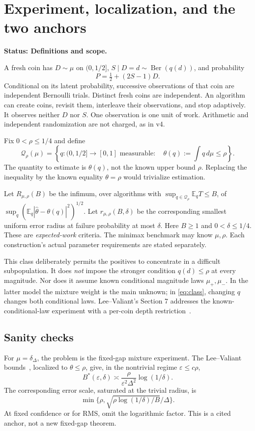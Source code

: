 \documentclass[11pt]{article}
\theoremstyle{definition}\newtheorem{conjecture}[theorem]{Conjecture}
\theoremstyle{remark}\newtheorem{remark}[theorem]{Remark}
\newcommand{\E}{\mathbb E}\newcommand{\PP}{\mathbb P}\newcommand{\R}{\mathbb R}
\newcommand{\Q}{\mathcal Q}\newcommand{\logp}{\log_+}
\newcommand{\status}[1]{\par\smallskip\noindent\textbf{Status: #1.}\par}
\begin{document}
\newpage
\tableofcontents
\newpage
\section{Experiment, localization, and the two anchors}
\status{Definitions and scope}
A fresh coin has $D\sim\mu$ on $(0,1/2]$, $S\mid D=d\sim\operatorname{Ber}(q(d))$, and probability
\[
 P=\tfrac12+(2S-1)D.
\]
Conditional on its latent probability, successive observations of that coin are independent Bernoulli trials. Distinct fresh coins are independent. An algorithm can create coins, revisit them, interleave their observations, and stop adaptively. It observes neither $D$ nor $S$. One observation is one unit of work. Arithmetic and independent randomization are not charged, as in v4.

Fix $0<\rho\le1/4$ and define
\begin{equation}\label{eq:class}
 \Q_\rho(\mu)=\left\{q:(0,1/2]\to[0,1]\text{ measurable}:\quad
 \theta(q):=\int q\,d\mu\le\rho\right\}.
\end{equation}
The quantity to estimate is $\theta(q)$, not the known upper bound $\rho$. Replacing the inequality by the known equality $\theta=\rho$ would trivialize estimation.

Let $R_{\mu,\rho}(B)$ be the infimum, over algorithms with $\sup_{q\in\Q_\rho}\E_qT\le B$, of $\sup_q(\E_q|\widehat\theta-\theta(q)|^2)^{1/2}$. Let $r_{\mu,\rho}(B,\delta)$ be the corresponding smallest uniform error radius at failure probability at most $\delta$. Here $B\ge1$ and $0<\delta\le1/4$. These are \emph{expected-work} criteria. The minimax benchmark may know $\mu,\rho$. Each construction's actual parameter requirements are stated separately.

This class deliberately permits the positives to concentrate in a difficult subpopulation. It does \emph{not} impose the stronger condition $q(d)\le\rho$ at every magnitude. Nor does it assume known conditional magnitude laws $\mu_+,\mu_-$. In the latter model the mixture weight is the main unknown; in \eqref{eq:class}, changing $q$ changes both conditional laws. Lee--Valiant's Section 7 addresses the known-conditional-law experiment with a per-coin depth restriction~\cite{lv}.

\subsection{Sanity checks}
For $\mu=\delta_\Delta$, the problem is the fixed-gap mixture experiment. The Lee--Valiant bounds~\cite{lv}, localized to $\theta\le\rho$, give, in the nontrivial regime $\varepsilon\le c\rho$,
\begin{equation}\label{eq:lvanchor}
 B^*(\varepsilon,\delta)\asymp
 \frac{\rho}{\varepsilon^2\Delta^2}\log(1/\delta).
\end{equation}
The corresponding error scale, saturated at the trivial radius, is
\[\min\{\rho,\sqrt{\rho\log(1/\delta)/B}/\Delta\}.\]
At fixed confidence or for RMS, omit the logarithmic factor. This is a cited anchor, not a new fixed-gap theorem.
\end{document}
